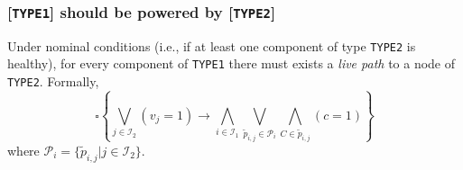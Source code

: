 \documentclass[journal]{IEEEtran}
\renewcommand{\next}{\ocircle}
\newcommand{\pfr}[1]{\mathcal{#1}}
\begin{document}
\subsubsection{[\texttt{TYPE1}] should be powered by [\texttt{TYPE2}]}

Under nominal conditions (i.e., if at least one component of type \texttt{TYPE2} is healthy), 
for every component of \texttt{TYPE1} there must exists a \emph{live path} to a node of \texttt{TYPE2}. 
Formally, 
%
\begin{equation}\label{eq:balanced}
\square \left\{ \bigvee_{j \in \mathcal{I}_2} (v_j = 1) \rightarrow \bigwedge_{i \in \mathcal{I}_1} \bigvee_{\tilde{p}_{i,j} \in \mathcal{P}_i} \bigwedge_{C \in \tilde{p}_{i,j}} (c = 1) \right\}
 \end{equation}
where $\pfr{P}_i = \{\tilde{p}_{i,j} | j \in \pfr{I}_2\}$.


\end{document}
